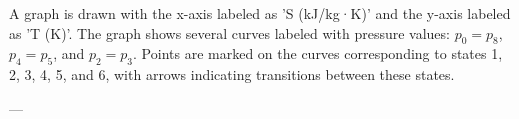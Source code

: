 A graph is drawn with the x-axis labeled as 'S (kJ/kg·K)' and the y-axis labeled as 'T (K)'. The graph shows several curves labeled with pressure values: \( p_0 = p_8 \), \( p_4 = p_5 \), and \( p_2 = p_3 \). Points are marked on the curves corresponding to states 1, 2, 3, 4, 5, and 6, with arrows indicating transitions between these states.

---